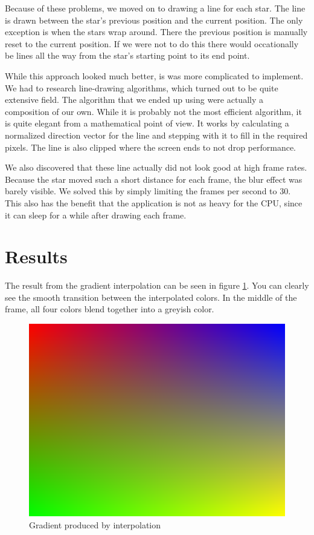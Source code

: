 \documentclass[a4paper]{article}
\begin{document}
Because of these problems, we moved on to drawing a line for each star.
The line is drawn between the star's previous position and the current position.
The only exception is when the stars wrap around.
There the previous position is manually reset to the current position.
If we were not to do this there would occationally be lines all the way from the star's starting point to its end point.

While this approach looked much better, is was more complicated to implement.
We had to research line-drawing algorithms, which turned out to be quite extensive field.
The algorithm that we ended up using were actually a composition of our own.
While it is probably not the most efficient algorithm, it is quite elegant from a mathematical point of view.
It works by calculating a normalized direction vector for the line and stepping with it to fill in the required pixels.
The line is also clipped where the screen ends to not drop performance.

We also discovered that these line actually did not look good at high frame rates.
Because the star moved such a short distance for each frame, the blur effect was barely visible.
We solved this by simply limiting the frames per second to 30.
This also has the benefit that the application is not as heavy for the CPU, since it can sleep for a while after drawing each frame.

\section{Results}
The result from the gradient interpolation can be seen in figure \ref{gradient_fig}.
You can clearly see the smooth transition between the interpolated colors.
In the middle of the frame, all four colors blend together into a greyish color.

\begin{figure}[H]
\begin{center}
\includegraphics[width=\textwidth]{gradient.png}
\caption{Gradient produced by interpolation}
\label{gradient_fig}
\end{center}
\end{figure}
\end{document}
